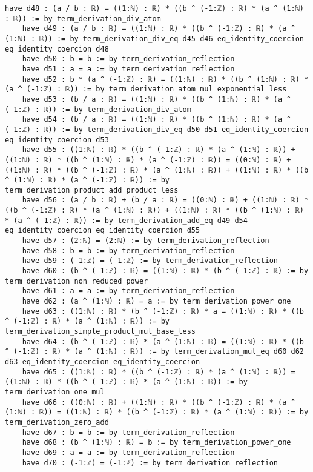 \documentclass{article}
\begin{document}
\begin{tcolorbox}[colback=white!10, width=\linewidth]
\begin{lstlisting}[language=Lean4]
    have d48 : (a / b : ℝ) = ((1:ℕ) : ℝ) * ((b ^ (-1:ℤ) : ℝ) * (a ^ (1:ℕ) : ℝ)) := by term_derivation_div_atom
    have d49 : (a / b : ℝ) = ((1:ℕ) : ℝ) * ((b ^ (-1:ℤ) : ℝ) * (a ^ (1:ℕ) : ℝ)) := by term_derivation_div_eq d45 d46 eq_identity_coercion eq_identity_coercion d48
    have d50 : b = b := by term_derivation_reflection
    have d51 : a = a := by term_derivation_reflection
    have d52 : b * (a ^ (-1:ℤ) : ℝ) = ((1:ℕ) : ℝ) * ((b ^ (1:ℕ) : ℝ) * (a ^ (-1:ℤ) : ℝ)) := by term_derivation_atom_mul_exponential_less
    have d53 : (b / a : ℝ) = ((1:ℕ) : ℝ) * ((b ^ (1:ℕ) : ℝ) * (a ^ (-1:ℤ) : ℝ)) := by term_derivation_div_atom
    have d54 : (b / a : ℝ) = ((1:ℕ) : ℝ) * ((b ^ (1:ℕ) : ℝ) * (a ^ (-1:ℤ) : ℝ)) := by term_derivation_div_eq d50 d51 eq_identity_coercion eq_identity_coercion d53
    have d55 : ((1:ℕ) : ℝ) * ((b ^ (-1:ℤ) : ℝ) * (a ^ (1:ℕ) : ℝ)) + ((1:ℕ) : ℝ) * ((b ^ (1:ℕ) : ℝ) * (a ^ (-1:ℤ) : ℝ)) = ((0:ℕ) : ℝ) + ((1:ℕ) : ℝ) * ((b ^ (-1:ℤ) : ℝ) * (a ^ (1:ℕ) : ℝ)) + ((1:ℕ) : ℝ) * ((b ^ (1:ℕ) : ℝ) * (a ^ (-1:ℤ) : ℝ)) := by term_derivation_product_add_product_less
    have d56 : (a / b : ℝ) + (b / a : ℝ) = ((0:ℕ) : ℝ) + ((1:ℕ) : ℝ) * ((b ^ (-1:ℤ) : ℝ) * (a ^ (1:ℕ) : ℝ)) + ((1:ℕ) : ℝ) * ((b ^ (1:ℕ) : ℝ) * (a ^ (-1:ℤ) : ℝ)) := by term_derivation_add_eq d49 d54 eq_identity_coercion eq_identity_coercion d55
    have d57 : (2:ℕ) = (2:ℕ) := by term_derivation_reflection
    have d58 : b = b := by term_derivation_reflection
    have d59 : (-1:ℤ) = (-1:ℤ) := by term_derivation_reflection
    have d60 : (b ^ (-1:ℤ) : ℝ) = ((1:ℕ) : ℝ) * (b ^ (-1:ℤ) : ℝ) := by term_derivation_non_reduced_power
    have d61 : a = a := by term_derivation_reflection
    have d62 : (a ^ (1:ℕ) : ℝ) = a := by term_derivation_power_one
    have d63 : ((1:ℕ) : ℝ) * (b ^ (-1:ℤ) : ℝ) * a = ((1:ℕ) : ℝ) * ((b ^ (-1:ℤ) : ℝ) * (a ^ (1:ℕ) : ℝ)) := by term_derivation_simple_product_mul_base_less
    have d64 : (b ^ (-1:ℤ) : ℝ) * (a ^ (1:ℕ) : ℝ) = ((1:ℕ) : ℝ) * ((b ^ (-1:ℤ) : ℝ) * (a ^ (1:ℕ) : ℝ)) := by term_derivation_mul_eq d60 d62 d63 eq_identity_coercion eq_identity_coercion
    have d65 : ((1:ℕ) : ℝ) * ((b ^ (-1:ℤ) : ℝ) * (a ^ (1:ℕ) : ℝ)) = ((1:ℕ) : ℝ) * ((b ^ (-1:ℤ) : ℝ) * (a ^ (1:ℕ) : ℝ)) := by term_derivation_one_mul
    have d66 : ((0:ℕ) : ℝ) + ((1:ℕ) : ℝ) * ((b ^ (-1:ℤ) : ℝ) * (a ^ (1:ℕ) : ℝ)) = ((1:ℕ) : ℝ) * ((b ^ (-1:ℤ) : ℝ) * (a ^ (1:ℕ) : ℝ)) := by term_derivation_zero_add
    have d67 : b = b := by term_derivation_reflection
    have d68 : (b ^ (1:ℕ) : ℝ) = b := by term_derivation_power_one
    have d69 : a = a := by term_derivation_reflection
    have d70 : (-1:ℤ) = (-1:ℤ) := by term_derivation_reflection

\end{lstlisting}
\end{tcolorbox}
\end{document}
